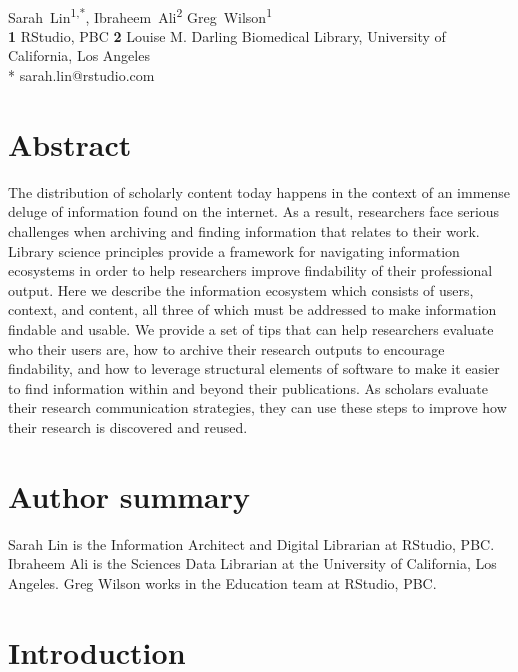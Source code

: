 \documentclass[10pt,letterpaper]{article}
\begin{document}
\vspace*{0.2in}

\begin{flushleft}
{\Large
\textbf{}
}
\newline
\\
{Sarah~Lin}\textsuperscript{1,*},
{Ibraheem~Ali}\textsuperscript{2}
{Greg~Wilson}\textsuperscript{1}
\\
\textbf{1} RStudio, PBC
\textbf{2} Louise M. Darling Biomedical Library, University of California, Los Angeles
\\
\bigskip
* sarah.lin@rstudio.com
\end{flushleft}

\section*{Abstract}

The distribution of scholarly content today happens in the context of an immense
deluge of information found on the internet. As a result, researchers face 
serious challenges when archiving and finding information that relates to their work.
Library science principles provide a framework for navigating information ecosystems
in order to help researchers improve findability of their professional output. Here
we describe the information ecosystem which consists of users, context, and 
content, all three of which must be addressed to make information findable and usable. 
We provide a set of tips that can help researchers evaluate who their users are, 
how to archive their research outputs to encourage findability, and how to leverage 
structural elements of software to make it easier to find information within and beyond
their publications. As scholars evaluate their research communication strategies, 
they can use these steps to improve how their research is discovered and reused.

\section*{Author summary}

Sarah Lin is the Information Architect and Digital Librarian at RStudio, PBC.
Ibraheem Ali is the Sciences Data Librarian at the University of California, Los Angeles.
Greg Wilson works in the Education team at RStudio, PBC.

\section*{Introduction}
\end{document}
